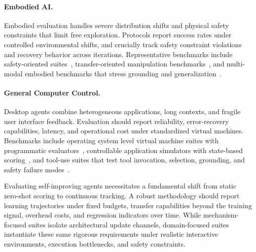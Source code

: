 \documentclass{article}
\begin{document}
\paragraph{Embodied AI.}
Embodied evaluation  handles severe distribution shifts and physical safety constraints that limit free exploration. Protocols report success rates under controlled environmental shifts, and crucially track safety constraint violations and recovery behavior across iterations. Representative benchmarks include safety-oriented suites~\citep{yin2025safeagentbenchbenchmarksafetask}, transfer-oriented manipulation benchmarks~\citep{gu2023maniskill2unifiedbenchmarkgeneralizable}, and multi-modal embodied benchmarks that stress grounding and generalization~\citep{yang2025embodiedbenchcomprehensivebenchmarkingmultimodal}.

\paragraph{General Computer Control.}
Desktop agents combine heterogeneous applications, long contexts, and fragile user interface feedback. Evaluation should report reliability, error-recovery capabilities, latency, and operational cost under standardized virtual machines. Benchmarks include operating system level virtual machine suites with programmatic evaluators~\citep{xie2024osworldbenchmarkingmultimodalagents, bonatti2024windowsagentarenaevaluating}, controllable application simulators with state-based scoring~\citep{trivedi2024appworldcontrollableworldapps}, and tool-use suites that test tool invocation, selection, grounding, and safety failure modes~\citep{patil2025the, huang2024metatoolbenchmarklargelanguage, ruan2024identifyingriskslmagents}.

\vspace{0.6em}
\begin{ttcolorbox}[Takeaway]
Evaluating self-improving agents necessitates a fundamental shift from static zero-shot scoring to continuous tracking.  A robust methodology should report learning trajectories under fixed budgets, transfer capabilities beyond the training signal, overhead costs, and regression indicators over time. While mechanism-focused suites isolate architectural update channels, domain-focused suites instantiate these same rigorous requirements under realistic interactive environments, execution bottlenecks, and safety constraints.
\end{ttcolorbox}
\end{document}

